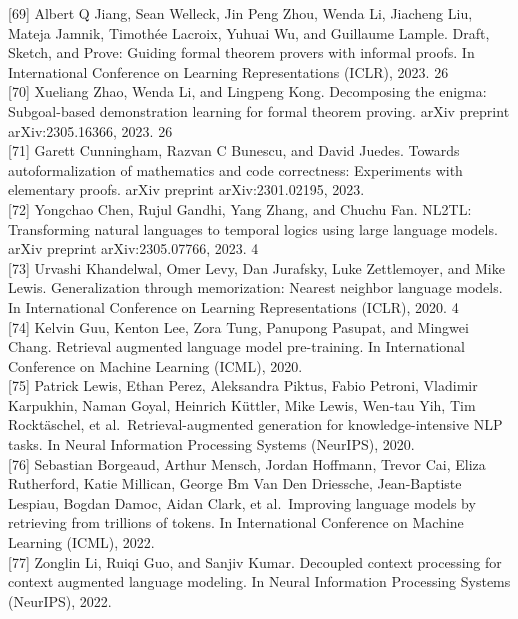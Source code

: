 \documentclass[
]{article}
\begin{document}
{[}69{]} Albert Q Jiang, Sean Welleck, Jin Peng Zhou, Wenda Li, Jiacheng
Liu, Mateja Jamnik, Timothée Lacroix, Yuhuai Wu, and Guillaume Lample.
Draft, Sketch, and Prove: Guiding formal theorem provers with informal
proofs. In International Conference on Learning Representations (ICLR),
2023. 26\\
{[}70{]} Xueliang Zhao, Wenda Li, and Lingpeng Kong. Decomposing the
enigma: Subgoal-based demonstration learning for formal theorem proving.
arXiv preprint arXiv:2305.16366, 2023. 26\\
{[}71{]} Garett Cunningham, Razvan C Bunescu, and David Juedes. Towards
autoformalization of mathematics and code correctness: Experiments with
elementary proofs. arXiv preprint arXiv:2301.02195, 2023.\\
{[}72{]} Yongchao Chen, Rujul Gandhi, Yang Zhang, and Chuchu Fan. NL2TL:
Transforming natural languages to temporal logics using large language
models. arXiv preprint arXiv:2305.07766, 2023. 4\\
{[}73{]} Urvashi Khandelwal, Omer Levy, Dan Jurafsky, Luke Zettlemoyer,
and Mike Lewis. Generalization through memorization: Nearest neighbor
language models. In International Conference on Learning Representations
(ICLR), 2020. 4\\
{[}74{]} Kelvin Guu, Kenton Lee, Zora Tung, Panupong Pasupat, and
Mingwei Chang. Retrieval augmented language model pre-training. In
International Conference on Machine Learning (ICML), 2020.\\
{[}75{]} Patrick Lewis, Ethan Perez, Aleksandra Piktus, Fabio Petroni,
Vladimir Karpukhin, Naman Goyal, Heinrich Küttler, Mike Lewis, Wen-tau
Yih, Tim Rocktäschel, et al.~Retrieval-augmented generation for
knowledge-intensive NLP tasks. In Neural Information Processing Systems
(NeurIPS), 2020.\\
{[}76{]} Sebastian Borgeaud, Arthur Mensch, Jordan Hoffmann, Trevor Cai,
Eliza Rutherford, Katie Millican, George Bm Van Den Driessche,
Jean-Baptiste Lespiau, Bogdan Damoc, Aidan Clark, et al.~Improving
language models by retrieving from trillions of tokens. In International
Conference on Machine Learning (ICML), 2022.\\
{[}77{]} Zonglin Li, Ruiqi Guo, and Sanjiv Kumar. Decoupled context
processing for context augmented language modeling. In Neural
Information Processing Systems (NeurIPS), 2022.
\end{document}
